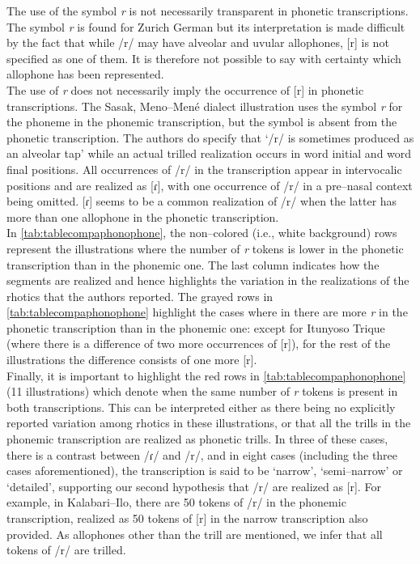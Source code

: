 The use of the symbol \textit{r} is not necessarily transparent in phonetic transcriptions. The symbol \textit{r} is found for Zurich German but its interpretation is made difficult by the fact that while /r/ may have alveolar and uvular allophones, [r] is not specified as one of them. It is therefore not possible to say with certainty which allophone has been represented. \\

The use of \textit{r} does not necessarily imply the occurrence of [r] in phonetic transcriptions. The Sasak, Meno–Mené dialect illustration uses the symbol \textit{r} for the phoneme in the phonemic transcription, but the symbol is absent from the phonetic transcription. The authors do specify that ‘/r/ is sometimes produced as an alveolar tap’ \parencite[97]{archangeliSasakMenoMeneDialect2020} while an actual trilled realization occurs in word initial and word final positions. All occurrences of /r/ in the transcription appear in intervocalic positions and are realized as [ɾ], with one occurrence of /r/ in a pre–nasal context being omitted. [ɾ] seems to be a common realization of /r/ when the latter has more than one allophone in the phonetic transcription.\\

In \autoref{tab:tablecompaphonophone}, the non–colored (i.e., white background) rows represent the illustrations where the number of \textit{r} tokens is lower in the phonetic transcription than in the phonemic one. The last column indicates how the segments are realized and hence highlights the variation in the realizations of the rhotics that the authors reported. The grayed rows in \autoref{tab:tablecompaphonophone} highlight the cases where in there are more \textit{r} in the phonetic transcription than in the phonemic one: except for Itunyoso Trique (where there is a difference of two more occurrences of [r]), for the rest of the illustrations the difference consists of one more [r].\\

Finally, it is important to highlight the red rows in \autoref{tab:tablecompaphonophone} (11 illustrations) which denote when the same number of \textit{r} tokens is present in both transcriptions. This can be interpreted either as there being no explicitly reported variation among rhotics in these illustrations, or that all the trills in the phonemic transcription are realized as phonetic trills. In three of these cases, there is a contrast between /ɾ/ and /r/, and in eight cases (including the three cases aforementioned), the transcription is said to be ‘narrow’, ‘semi–narrow’ or ‘detailed’, supporting our second hypothesis that /r/ are realized as [r]. For example, in Kalabari–Ilo, there are 50 tokens of /r/ in the phonemic transcription, realized as 50 tokens of [r] in the narrow transcription also provided. As allophones other than the trill are mentioned, we infer that all tokens of /r/ are trilled.

